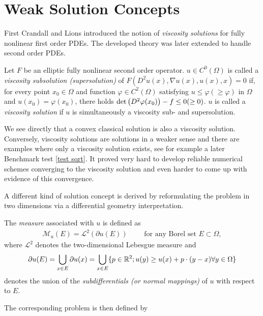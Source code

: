 \section{Weak Solution Concepts}
First Crandall and Lions \cite{CL1983} introduced the notion of \emph{viscosity solutions} for fully nonlinear first order PDEs. The developed theory was later extended to handle second order PDEs.
\begin{definition}
	Let $F$ be an elliptic  fully nonlinear second order operator.
	$u \in C^0(\Omega)$ is called a \emph{viscosity subsolution (supersolution)} of $F(D^2u(x), \nabla u(x), u(x), x)=0$  if, for every point $x_0 \in \Omega$ and function $\varphi \in C^2(\Omega)$ satisfying $u \leq \varphi (\geq \varphi)$ in $\Omega$ and $u(x_0) = \varphi(x_0)$, there holds $\det{\left(D^2 \varphi(x_0)\right)} - f \leq 0 (\geq 0)$. 
	$u$ is called a \emph{viscosity solution} if $u$ is simultaneously a viscosity sub- and supersolution.
\end{definition}

We see directly that a convex classical solution is also a viscosity solution. Conversely, viscosity solutions are solutions in a weaker sense and there are examples where only a viscosity solution exists, see for example a later Benchmark test \ref{test sqrt}.
It proved very hard to develop reliable numerical schemes converging to the viscosity solution and even harder to come up with evidence of this convergence.

A different kind of solution concept is derived by reformulating the \MA problem in two dimensions via a differential geometry interpretation.

\begin{definition}\label{def:MA measure}
	The \emph{\MA measure} associated with $u$ is defined as 
	\begin{align}
		\mathcal{M}_u (E) = \mathcal{L}^2(\partial u(E)) \qquad \text{ for any Borel set } E \subset \Omega,
	\end{align}
	where $\mathcal{L}^2$ denotes the two-dimensional Lebesgue measure and 
	\[
		\partial u(E) = \bigcup_{x \in E} \partial u (x) = \bigcup_{x \in E} \{p \in \mathbb{R}^2; u(y) \geq u(x) +p\cdot (y-x) \forall y \in \Omega\}
	\]
	denotes the union of the \emph{subdifferentials (or normal mappings)} of $u$ with respect to $E$.
\end{definition}
The corresponding \MA problem is then defined by

